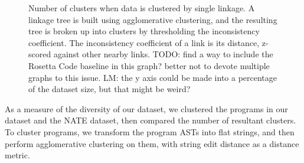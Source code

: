 \documentclass[conference]{IEEEtran}
\begin{document}

\begin{figure}
\caption{Number of clusters when data is clustered by single linkage.
  A linkage tree is built using agglomerative clustering, and the resulting tree is broken up
  into clusters by thresholding the inconsistency coefficient. The inconsistency coefficient
  of a link is its distance, z-scored against other nearby links. TODO: find a way to include
  the Rosetta Code baseline in this graph? better not to devote multiple graphs to this issue.
  LM: the y axis could be made into a percentage of the dataset size, but that might be
  weird?}
\label{fig-diversity}
\end{figure}

As a measure of the diversity of our dataset, we clustered the programs in
our dataset and the NATE dataset, then compared the number of resultant clusters.
To cluster programs, we transform the program ASTs into flat strings, and then
perform agglomerative clustering on them, with string edit distance as a distance
metric.
\end{document}
